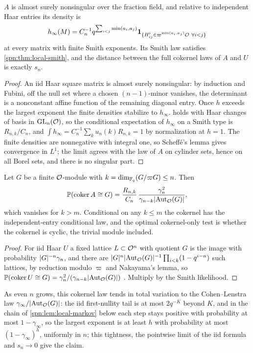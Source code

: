 \begin{proposition}\label{spn:prop:local-infinity}
$A$ is almost surely nonsingular over the fraction field, and relative to independent Haar entries
its density is
\[
 h_\infty(M)=C_n^{-1}q^{\sum_{i<j}\min(a_i,a_j)}\mathbf 1_{\{H'_{ij}\in\varpi^{\min(a_i,a_j)}\mathcal{O}\ \forall i<j\}}
\]
at every matrix with finite Smith exponents. Its Smith law satisfies \cref{spn:thm:local-smith}, and
the distance between the full cokernel laws of $A$ and $U$ is exactly $s_n$.
\end{proposition}
\begin{proof}
An iid Haar square matrix is almost surely nonsingular: by induction and Fubini, off the null set
where a chosen $(n-1)$-minor vanishes, the determinant is a nonconstant affine function of the
remaining diagonal entry. Once $h$ exceeds the largest exponent the finite densities stabilize to
$h_\infty$.  holds with Haar changes of basis in $\operatorname{GL}_n(\mathcal{O})$, so the
conditional expectation of $h_\infty$ on a Smith type is $R_{n,k}/C_n$, and
$\int h_\infty=C_n^{-1}\sum_ku_n(k)R_{n,k}=1$ by normalization at $h=1$. The finite densities are
nonnegative with integral one, so Scheff\'e's lemma gives convergence in $L^1$; the limit agrees with
the law of $A$ on cylinder sets, hence on all Borel sets, and there is no singular part.
\end{proof}

\begin{corollary}\label{spn:cor:local-cokernel}
Let $G$ be a finite $\mathcal{O}$-module with $k=\dim_{\mathbb{F}_q}(G/\varpi G)\le n$. Then
\[
 \mathbb{P}(\operatorname{coker} A\cong G)=\frac{R_{n,k}}{C_n}\,\frac{\gamma_n^2}{\gamma_{n-k}\lvert\operatorname{Aut}_{\mathcal{O}}(G)\rvert},
\]
which vanishes for $k>m$. Conditional on any $k\le m$ the cokernel has the independent-entry
conditional law, and the optimal cokernel-only test is whether the cokernel is cyclic, the trivial
module included.
\end{corollary}
\begin{proof}
For iid Haar $U$ a fixed lattice $L\subset\mathcal{O}^n$ with quotient $G$ is the image with probability
$\lvert G\rvert^{-n}\gamma_n$, and there are $\lvert G\rvert^n\lvert\operatorname{Aut}_{\mathcal{O}}(G)\rvert^{-1}\prod_{i<k}(1-q^{i-n})$ such lattices, by
reduction modulo $\varpi$ and Nakayama's lemma, so
$\mathbb{P}(\operatorname{coker} U\cong G)=\gamma_n^2/(\gamma_{n-k}\lvert\operatorname{Aut}_{\mathcal{O}}(G)\rvert)$ \cite{WangStanley2017Smith}. Multiply by
the Smith likelihood.
\end{proof}

As even $n$ grows, this cokernel law tends in total variation to the Cohen--Lenstra law
$\gamma_\infty/\lvert\operatorname{Aut}_{\mathcal{O}}(G)\rvert$: the iid first-nullity tail is at most $2q^{-K}$ beyond $K$, and in the
chain of \cref{spn:lem:local-markov} below each step stays positive with probability at most
$1-\gamma_\infty$, so the largest exponent is at least $h$ with probability at most $(1-\gamma_\infty)^h$,
uniformly in $n$; this tightness, the pointwise limit of the iid formula and $s_n\to0$ give the
claim.

